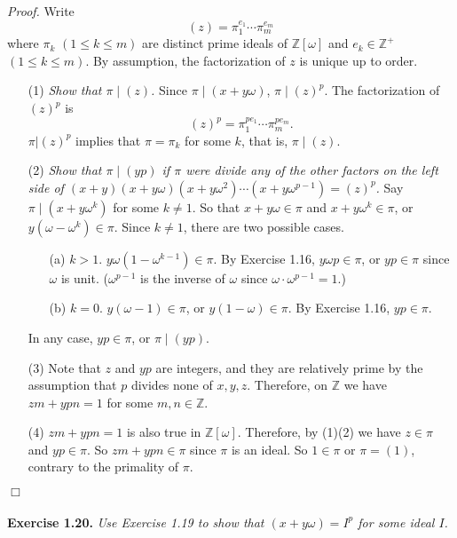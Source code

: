\documentclass{article}
\begin{document}
\emph{Proof.}
Write $$(z) = {\pi}_1^{e_1} \cdots {\pi}_m^{e_m}$$ where
$\pi_k$ $(1 \leq k \leq m)$ are distinct prime ideals of $\mathbb{Z}[\omega]$ and
$e_k \in \mathbb{Z}^+$ $(1 \leq k \leq m)$.
By assumption, the factorization of $z$ is unique up to order.
\begin{enumerate}
\item[(1)]
\emph{Show that $\pi \mid (z)$.}
Since $\pi \mid (x + y\omega)$, $\pi \mid (z)^p$.
The factorization of $(z)^p$ is
$$(z)^p = {\pi}_1^{pe_1} \cdots {\pi}_m^{pe_m}.$$
$\pi | (z)^p$ implies that $\pi = \pi_k$ for some $k$,
that is, $\pi \mid (z)$.
\item[(2)]
\emph{Show that $\pi \mid (yp)$ if $\pi$ were divide any of
the other factors on the left side of
$(x+y)(x+y\omega)(x+y\omega^2) \cdots (x+y\omega^{p-1}) = (z)^p$.}
Say $\pi \mid (x+y\omega^k)$ for some $k \neq 1$.
So that $x+y\omega \in \pi$ and $x+y\omega^k \in \pi$,
or $y(\omega - \omega^k) \in \pi$.
Since $k \neq 1$, there are two possible cases.
  \begin{enumerate}
  \item[(a)]
  $k > 1$. $y\omega(1 - \omega^{k-1}) \in \pi$.
  By Exercise 1.16, $y\omega p \in \pi$, or $yp \in \pi$ since $\omega$ is unit.
  ($\omega^{p-1}$ is the inverse of $\omega$ since $\omega \cdot \omega^{p-1} = 1$.)
  \item[(b)]
  $k = 0$. $y(\omega - 1) \in \pi$, or $y(1 - \omega) \in \pi$.
  By Exercise 1.16, $yp \in \pi$.
  \end{enumerate}
In any case, $yp \in \pi$, or $\pi \mid (yp)$.
\item[(3)]
Note that $z$ and $yp$ are integers, and they are relatively prime by the assumption
that $p$ divides none of $x, y, z$.
Therefore, on $\mathbb{Z}$ we have $zm + ypn = 1$ for some $m, n \in \mathbb{Z}$.
\item[(4)]
$zm + ypn = 1$ is also true in $\mathbb{Z}[\omega]$.
Therefore, by (1)(2) we have $z \in \pi$ and $yp \in \pi$.
So $zm + ypn \in \pi$ since $\pi$ is an ideal.
So $1 \in \pi$ or $\pi = (1)$, contrary to the primality of $\pi$.
\end{enumerate}
$\Box$ \\\\






\textbf{Exercise 1.20.}
\emph{Use Exercise 1.19 to show that
$(x+y\omega) = I^p$ for some ideal $I$. } \\
\end{document}
